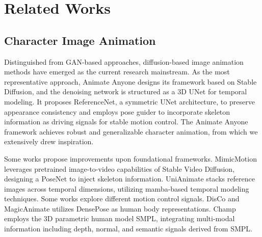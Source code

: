 \section{Related Works}
\subsection{Character Image Animation}
Distinguished from GAN-based\cite{gan,wgan,stylegan} approaches\cite{fomm,mraa,ren2020deep,tpsmm,siarohin2019animating,zhang2022exploring,bidirectionally,everybody}, diffusion-based image animation methods\cite{dreampose,disco,aa,magicanimate,magicpose,mimicmotion,champ,unianimate,tcan,tpc} have emerged as the current research mainstream. As the most representative approach, Animate Anyone\cite{aa} designs its framework based on Stable Diffusion\cite{ldm}, and the denoising network is structured as a 3D UNet\cite{align,animatediff} for temporal modeling. It proposes ReferenceNet, a symmetric UNet\cite{unet} architecture, to preserve appearance consistency and employs pose guider to incorporate skeleton information as driving signals for stable motion control. The Animate Anyone framework achieves robust and generalizable character animation, from which we extensively drew inspiration.

Some works propose improvements upon foundational frameworks. MimicMotion\cite{mimicmotion} leverages pretrained image-to-video capabilities of Stable Video Diffusion\cite{svd}, designing a PoseNet to inject skeleton information. UniAnimate\cite{unianimate} stacks reference images across temporal dimensions, utilizing mamba-based\cite{mamba} temporal modeling techniques. Some works explore different motion control signals. DisCo\cite{disco} and MagicAnimate\cite{magicanimate} utilizes DensePose\cite{densepose} as human body representations. Champ\cite{champ} employs the 3D parametric human model SMPL\cite{smpl}, integrating multi-modal information including depth, normal, and semantic signals derived from SMPL.






